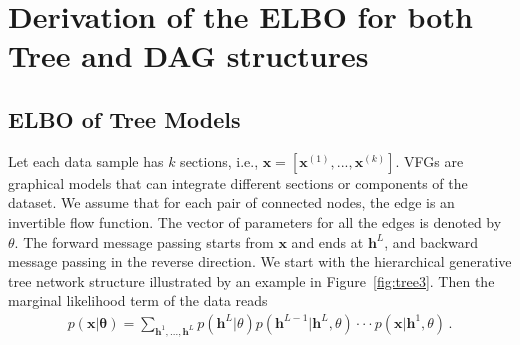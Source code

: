 \documentclass{article}
\begin{document}
\begin{figure}[H]
\begin{center}
{						  
		}
	\end{center}
  \label{fig:mnist_dis}
\end{figure}


\section{Derivation of the ELBO for both Tree and DAG structures}
\subsection{ELBO of Tree Models}\label{appd:tree_elbo}

Let each data sample has $k$ sections, i.e., $\mathbf{x} = [\mathbf{x}^{(1)}, ..., \mathbf{x}^{(k)}]$. VFGs are graphical models that can integrate different sections or components of the dataset.  We assume that for each pair of connected nodes, the edge is an invertible flow function. 
The vector of parameters for all the edges is denoted by $\theta$. 
The forward message passing starts from $\mathbf{x}$ and ends at $\mathbf{h}^L$, and backward message passing in the reverse direction. We start with the hierarchical generative tree network structure illustrated by an example in Figure~\ref{fig:tree3}. 
Then the marginal likelihood term of the data reads
\begin{align*}
p(\mathbf{x}| \mathbf{\theta}) = \sum_{\mathbf{h}^1, ..., \mathbf{h}^L} p(\mathbf{h}^L | \theta)p(\mathbf{h}^{L-1} | \mathbf{h}^{L},\theta) \cdot \cdot  \cdot  p(\mathbf{x} | \mathbf{h}^{1}, \theta) \, .
\end{align*}
\end{document}
